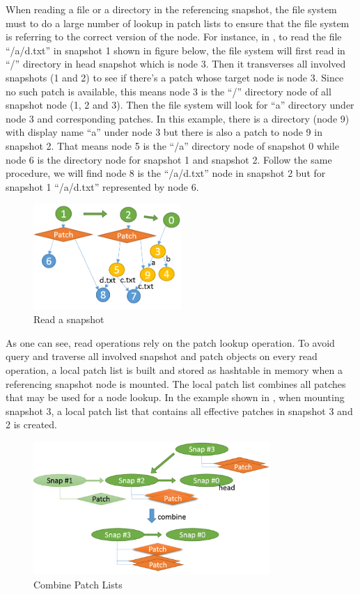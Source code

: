     When reading a file or a directory in the referencing snapshot, the file system must to do a large number of lookup in patch lists to ensure that the file system is referring to the correct version of the node. For instance, in  , to read the file ``/a/d.txt'' in snapshot 1 shown in figure below, the file system will first read in ``/'' directory in head snapshot which is node 3. Then it transverses all involved snapshots (1 and 2) to see if there's a patch whose target node is node 3. Since no such patch is available, this means node 3 is the ``/'' directory node of all snapshot node (1, 2 and 3). Then the file system will look for “a” directory under node 3 and corresponding patches. In this example, there is a directory (node 9) with display name “a” under node 3 but there is also a patch to node 9 in snapshot 2. That means node 5 is the ``/a'' directory node of snapshot 0 while node 6 is the directory node for snapshot 1 and snapshot 2. Follow the same procedure, we will find node 8 is the ``/a/d.txt'' node in snapshot 2 but for snapshot 1 ``/a/d.txt'' represented by node 6.

\begin{figure}[hbtp]
\centering
\includegraphics[width=0.5\textwidth]{Chapter-4/figs/fig18.png}
\caption{Read a snapshot}
\label{fig:read_patches}
\end{figure}

    As one can see, read operations rely on the patch lookup operation. To avoid query and traverse all involved snapshot and patch objects on every read operation, a local patch list is built and stored as hashtable in memory when a referencing snapshot node is mounted. The local patch list combines all patches that may be used for a node lookup. In the example shown in , when mounting snapshot 3, a local patch list that contains all effective patches in snapshot 3 and 2 is created.

\begin{figure}[hbtp]
\centering
\includegraphics[width=0.8\textwidth]{Chapter-4/figs/fig15.png}
\caption{Combine Patch Lists}
\label{fig:combine_patch_list}
\end{figure}

